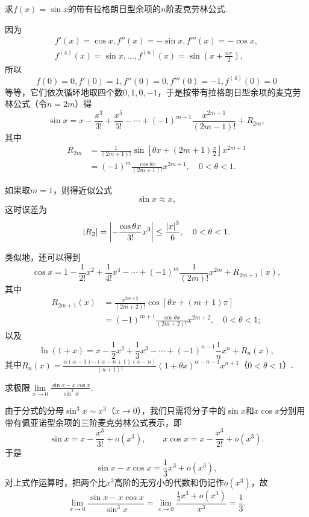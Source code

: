 \begin{example}
求\(f(x)=\sin x\)的带有拉格朗日型余项的\(n\)阶麦克劳林公式.
\begin{solution}
因为\[
\begin{split}
f'(x)=\cos x,
f''(x)=-\sin x,
f'''(x)=-\cos x, \\
f^{(4)}(x)=\sin x,
\dotsc,
f^{(n)}(x)=\sin\left(x+\frac{n\pi}{2}\right),
\end{split}
\]所以\[
f(0)=0,f'(0)=1,f''(0)=0,f'''(0)=-1,f^{(4)}(0)=0
\]等等，它们依次循环地取四个数\(0,1,0,-1\)，于是按带有拉格朗日型余项的麦克劳林公式（令\(n=2m\)）得\[
\sin x = x - \frac{x^3}{3!} + \frac{x^5}{5!} - \dotsb + (-1)^{m-1} \frac{x^{2m-1}}{(2m-1)!} + R_{2m},
\]其中\[
\begin{split}
R_{2m}
&= \frac{1}{(2m+1)!} \sin\left[\theta x + (2m+1)\frac{\pi}{2}\right] x^{2m+1} \\
&= (-1)^m \frac{\cos \theta x}{(2m+1)!} x^{2m+1},
\quad 0<\theta<1.
\end{split}
\]

如果取\(m=1\)，则得近似公式\[
\sin x \approx x,
\]这时误差为\[
\abs{R_2} = \abs{-\frac{\cos \theta x}{3!} x^3}
\leq \frac{\abs{x}^3}{6},
\quad 0<\theta<1.
\]
\end{solution}
\end{example}

类似地，还可以得到\[
\cos x
= 1 - \frac{1}{2!} x^2
	+ \frac{1}{4!} x^4 - \dotsb
	+ (-1)^m \frac{1}{(2m)!} x^{2m}
	+ R_{2m+1}(x),
\]其中\[
\begin{split}
R_{2m+1}(x)
&= \frac{x^{2m+2}}{(2m+2)!} \cos\left[\theta x + (m+1)\pi\right] \\
&= (-1)^{m+1} \frac{\cos \theta x}{(2m+2)!} x^{2m+2},
\quad 0<\theta<1;
\end{split}
\]
以及
\[
\ln (1+x) = x - \frac{1}{2} x^2 + \frac{1}{3} x^3 - \dotsb + (-1)^{n-1} \frac{1}{n} x^n + R_n(x),
\]其中\(R_n(x) = \frac{\alpha(\alpha-1)\dotsm(\alpha-n+1)(\alpha-n)}{(n+1)!} (1+\theta x)^{\alpha-n-1} x^{n+1}\)（\(0<\theta<1\)）.

\begin{example}
求极限\(\lim\limits_{x\to0}\frac{\sin x - x \cos x}{\sin^3 x}\).
\begin{solution}
由于分式的分母\(\sin^3 x \sim x^3\)（\(x\to0\)），我们只需将分子中的\(\sin x\)和\(x \cos x\)分别用带有佩亚诺型余项的三阶麦克劳林公式表示，即\[
\sin x = x - \frac{x^3}{3!} + o(x^3),
\qquad
x \cos x = x - \frac{x^3}{2!} + o(x^3).
\]于是\[
\sin x - x \cos x = \frac{1}{3} x^3 + o(x^3),
\]对上式作运算时，把两个比\(x^3\)高阶的无穷小的代数和仍记作\(o(x^3)\)，故\[
\lim\limits_{x\to0}\frac{\sin x - x \cos x}{\sin^3 x}
= \lim\limits_{x\to0}\frac{\frac{1}{3} x^3 + o(x^3)}{x^3} = \frac{1}{3}.
\]
\end{solution}
\end{example}

